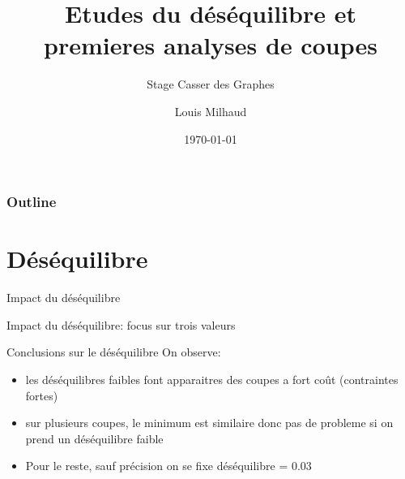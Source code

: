 \documentclass[aspectratio=169]{beamer}
\title{Etudes du déséquilibre et premieres analyses de coupes}
\subtitle{Stage Casser des Graphes}
\author{Louis Milhaud}
\institute{Complex Networks - LIP6}
\date{\today}
\begin{document}
    \begin{frame}
        \titlepage
    \end{frame}

    \begin{frame}
        \frametitle{Outline}
        \tableofcontents
    \end{frame}

    \section{Déséquilibre}
    
    \begin{frame}{Impact du déséquilibre}
        \begin{center}
            
        \end{center}
    \end{frame}

    \begin{frame}{Impact du déséquilibre: focus sur trois valeurs}
       \begin{center}
           
       \end{center}
    \end{frame} 

    \begin{frame}{Conclusions sur le déséquilibre}
        On observe:
        \begin{itemize}
            \item les déséquilibres faibles font apparaitres des coupes a fort coût (contraintes fortes)
            \item sur plusieurs coupes, le minimum est similaire donc pas de probleme si on prend un déséquilibre faible
            \item Pour le reste, sauf précision on se fixe déséquilibre = 0.03
        \end{itemize}
    \end{frame}
\end{document}
